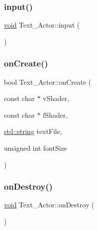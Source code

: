 \mbox{\label{classText__Actor_acbb29cf3a69e2858880e6f680f395579}} 
\subsubsection{\texorpdfstring{input()}{input()}}
{\footnotesize\ttfamily \hyperlink{imgui__impl__opengl3__loader_8h_ac668e7cffd9e2e9cfee428b9b2f34fa7}{void} Text\+\_\+\+Actor\+::input (\begin{DoxyParamCaption}{ }\end{DoxyParamCaption})}

\mbox{\label{classText__Actor_a07ecf27d5a9e6b29187a9d0e6a47d4a2}} 
\subsubsection{\texorpdfstring{on\+Create()}{onCreate()}}
{\footnotesize\ttfamily bool Text\+\_\+\+Actor\+::on\+Create (\begin{DoxyParamCaption}\item[{const char $\ast$}]{v\+Shader,  }\item[{const char $\ast$}]{f\+Shader,  }\item[{\hyperlink{imgui__impl__opengl3__loader_8h_ac83513893df92266f79a515488701770}{std\+::string}}]{text\+File,  }\item[{unsigned int}]{font\+Size }\end{DoxyParamCaption})}

\mbox{\label{classText__Actor_af9b25da889aad4aec6f17671c37ac431}} 
\subsubsection{\texorpdfstring{on\+Destroy()}{onDestroy()}}
{\footnotesize\ttfamily \hyperlink{imgui__impl__opengl3__loader_8h_ac668e7cffd9e2e9cfee428b9b2f34fa7}{void} Text\+\_\+\+Actor\+::on\+Destroy (\begin{DoxyParamCaption}{ }\end{DoxyParamCaption})\hspace{0.3cm}{\ttfamily [virtual]}}



